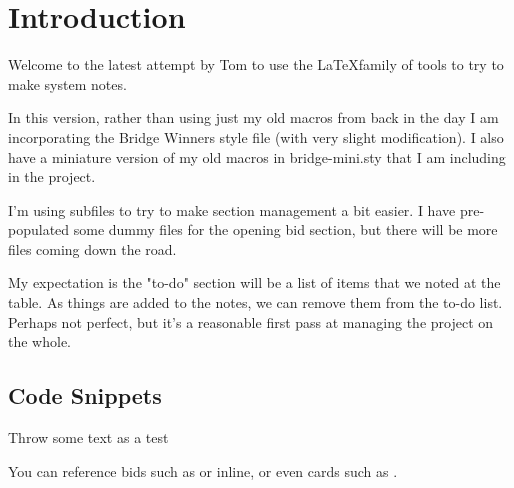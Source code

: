 \documentclass[tom-ari]{subfile}
\begin{document}
\chapter{Introduction}

Welcome to the latest attempt by Tom to use the \LaTeX family of tools to try to make system notes.  

In this version, rather than using just my old macros from back in the day I am incorporating the Bridge Winners style file (with very slight modification).  I also have a miniature version of my old macros in bridge-mini.sty that I am including in the project.

I'm using subfiles to try to make section management a bit easier.  I have pre-populated some dummy files for the opening bid section, but there will be more files coming down the road.

My expectation is the "to-do" section will be a list of items that we noted at the table.  As things are added to the notes, we can remove them from the to-do list.  Perhaps not perfect, but it's a reasonable first pass at managing the project on the whole.

\section{Code Snippets}

Throw some text as a test

\flushleft{} 

You can reference bids such as    or  inline, or even cards such as    . 
\end{document}
